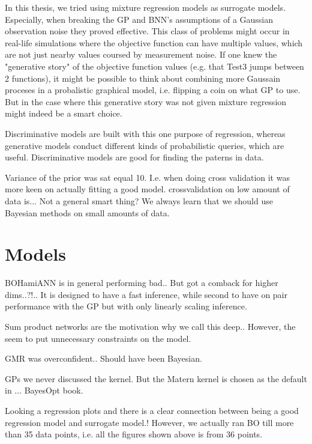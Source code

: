 In this thesis, we tried using mixture regression models as surrogate models. Especially, when breaking the 
GP and BNN's assumptions of a Gaussian observation noise they proved effective. This class of problems
might occur in real-life simulations where the objective function can have multiple values, which are not
just nearby values coursed by measurement noise. If one knew the "generative story" of the
objective function values (e.g. that Test3 jumps between 2 functions), it might be possible to think about combining more Gaussain proceses in a probalistic
graphical model, i.e. flipping a coin on what GP to use. But in the case where this generative story was not given 
mixture regression might indeed be a smart choice. 

Discriminative models are built with this one purpose of regression, whereas generative models
conduct different kinds of probabilistic queries, which are useful. Discriminative models are good
for finding the paterns in data. 

Variance of the prior was sat equal 10. I.e. when doing cross validation it was more keen on actually fitting a good model. 
crossvalidation on low amount of data is... Not a general smart thing? We always learn that we should use Bayesian methods 
on small amounts of data. 


\section{Models}
BOHamiANN is in general performing bad.. But got a comback for higher dims..?!.. It is designed to
have a fast inference, while second to have on pair performance with the GP but with only linearly
scaling inference.

Sum product networks are the motivation why we call this deep.. However, the seem to put unnecessary constraints on 
the model. 

GMR was overconfident.. Should have been Bayesian.

GPs we never discussed the kernel. But the Matern kernel is chosen as the default in ... BayesOpt book. 

Looking a regression plots and there is a clear connection between being a good regression
model and surrogate model.! However, we actually ran BO till more than 35 data points, i.e. 
all the figures shown above is from 36 points. 

